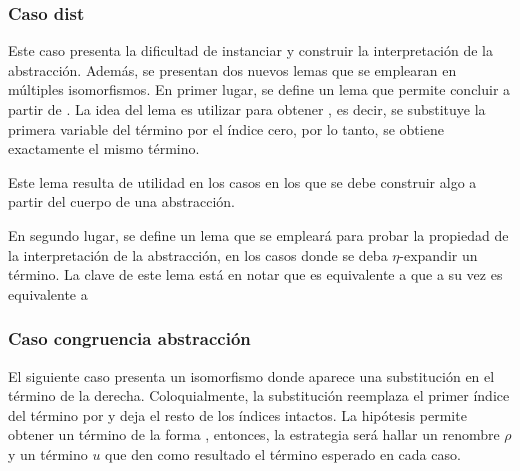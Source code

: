 
\subsubsection{Caso dist}

Este caso presenta la dificultad de instanciar y construir la interpretación de la abstracción.
Además, se presentan dos nuevos lemas que se emplearan en múltiples isomorfismos.
En primer lugar, se define un lema que permite concluir \snstar{} a partir de \snstar {} .
La idea del lema es utilizar  para obtener
, es decir, se substituye la primera variable del término por el índice cero, por lo tanto, se obtiene exactamente el mismo término.



Este lema resulta de utilidad en los casos en los que se debe construir algo a partir del cuerpo de una abstracción.


En segundo lugar, se define un lema que se empleará para probar la propiedad de la interpretación de la abstracción, en los casos donde se deba $\eta$-expandir un término.
La clave de este lema está en notar que 
es equivalente a  que a su vez es equivalente a  \bound{$\rho$} 



\subsubsection{Caso congruencia abstracción}

El siguiente caso presenta un isomorfismo donde aparece una substitución en el término de la derecha.
Coloquialmente, la substitución  reemplaza el primer índice del término por
\const{[}  \const{]≡} 
y deja el resto de los índices intactos.
La hipótesis  permite obtener un término de la forma
\snstar
{}
, entonces, la estrategia será hallar un renombre $\rho$ y un término $u$ que den como resultado el término esperado en cada caso.

